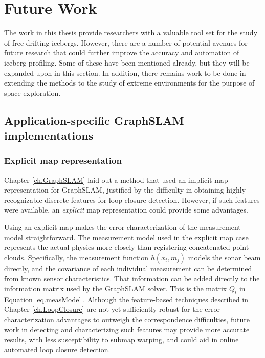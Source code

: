 \section{Future Work}

The work in this thesis provide researchers with a valuable tool set for the study of free drifting icebergs. However, there  are a number of potential avenues for future research that could further improve the accuracy and automation of iceberg profiling. Some of these have been mentioned already, but they will be expanded upon in this section. In addition, there remains work to be done in extending the methods to the study of extreme environments for the purpose of space exploration. 


\subsection{Application-specific GraphSLAM implementations}
\label{sec.DesignConsiderations}
\subsubsection{Explicit map representation}

Chapter \ref{ch.GraphSLAM} laid out a method that used an implicit map representation for GraphSLAM, justified by the difficulty in obtaining highly recognizable discrete features for loop closure detection. However, if such features were available, an \emph{explicit} map representation could provide some advantages. 

Using an explicit map makes the error characterization of the measurement model straightforward. The measurement model used in the explicit map case represents the actual physics more closely than registering concatenated point clouds. Specifically, the measurement function $h\left(x_t,m_j\right)$ models the sonar beam directly, and the covariance of each individual measurement can be determined from known sensor characteristics. That information can be added directly to the information matrix used by the GraphSLAM solver. This is the matrix $Q_t$ in Equation \ref{eq.measModel}. Although the feature-based techniques described in Chapter \ref{ch.LoopClosure} are not yet sufficiently robust for the error characterization advantages to outweigh the correspondence difficulties, future work in detecting and characterizing such features may provide more accurate results, with less susceptibility to submap warping, and could aid in online automated loop closure detection. 

